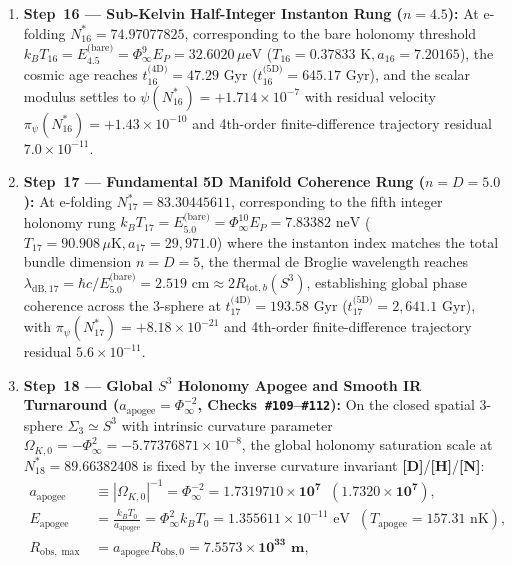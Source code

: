 \documentclass[11pt,a4paper]{article}
\newcommand{\catD}{\textbf{\textcolor{blue!75!black}{[D]}}}
\newcommand{\catH}{\textbf{\textcolor{orange!85!black}{[H]}}}
\newcommand{\catN}{\textbf{\textcolor{teal!75!black}{[N]}}}
\theoremstyle{plain}
\theoremstyle{definition}
\theoremstyle{remark}
\numberwithin{equation}{section}
\begin{document}
\begin{enumerate}
  \item \textbf{Step~16 --- Sub-Kelvin Half-Integer Instanton Rung ($n = 4.5$):} At e-folding $N_{16}^* = 74.97077825$, corresponding to the bare holonomy threshold $k_B T_{16} = E_{4.5}^{\text{(bare)}} = \Phi_{\infty}^9 E_P = 32.6020\,\mu\text{eV}$ ($T_{16} = 0.37833\text{ K}, a_{16} = 7.20165$), the cosmic age reaches $t_{16}^{\text{(4D)}} = 47.29\text{ Gyr}$ ($t_{16}^{\text{(5D)}} = 645.17\text{ Gyr}$), and the scalar modulus settles to $\psi(N_{16}^*) = +1.714 \times 10^{-7}$ with residual velocity $\pi_{\psi}(N_{16}^*) = +1.43 \times 10^{-10}$ and 4th-order finite-difference trajectory residual $7.0 \times 10^{-11}$.
  \item \textbf{Step~17 --- Fundamental 5D Manifold Coherence Rung ($n = D = 5.0$):} At e-folding $N_{17}^* = 83.30445611$, corresponding to the fifth integer holonomy rung $k_B T_{17} = E_{5.0}^{\text{(bare)}} = \Phi_{\infty}^{10}E_P = 7.83382\text{ neV}$ ($T_{17} = 90.908\,\mu\text{K}, a_{17} = 29{,}971.0$) where the instanton index matches the total bundle dimension $n = D = 5$, the thermal de Broglie wavelength reaches $\lambda_{\text{dB},17} = \hbar c / E_{5.0}^{\text{(bare)}} = 2.519\text{ cm} \approx 2 R_{\text{tot},b}(S^3)$, establishing global phase coherence across the 3-sphere at $t_{17}^{\text{(4D)}} = 193.58\text{ Gyr}$ ($t_{17}^{\text{(5D)}} = 2{,}641.1\text{ Gyr}$), with $\pi_{\psi}(N_{17}^*) = +8.18 \times 10^{-21}$ and 4th-order finite-difference trajectory residual $5.6 \times 10^{-11}$.
  \item \textbf{Step~18 --- Global $S^3$ Holonomy Apogee and Smooth IR Turnaround ($a_{\text{apogee}} = \Phi_{\infty}^{-2}$, Checks~\texttt{\#109}--\texttt{\#112}):} On the closed spatial 3-sphere $\Sigma_3 \simeq S^3$ with intrinsic curvature parameter $\Omega_{K,0} = -\Phi_{\infty}^2 = -5.77376871 \times 10^{-8}$, the global holonomy saturation scale at $N_{18}^* = 89.66382408$ is fixed by the inverse curvature invariant \catD/\catH/\catN:
  \begin{align}
    a_{\text{apogee}} &\equiv \left\lvert\Omega_{K,0}\right\rvert^{-1} = \Phi_{\infty}^{-2} = \mathbf{1.7319710 \times 10^7} \;\; \left(\mathbf{1.7320 \times 10^7}\right), \nonumber \\[3pt]
    E_{\text{apogee}} &= \frac{k_B T_0}{a_{\text{apogee}}} = \Phi_{\infty}^2 k_B T_0 = 1.355611 \times 10^{-11}\text{ eV} \;\; \left(T_{\text{apogee}} = 157.31\text{ nK}\right), \nonumber \\[3pt]
    R_{\text{obs},\max} &= a_{\text{apogee}} R_{\text{obs},0} = \mathbf{7.5573 \times 10^{33}\text{ m}}, \nonumber \\[3pt]

\end{align}
\end{enumerate}
\end{document}
